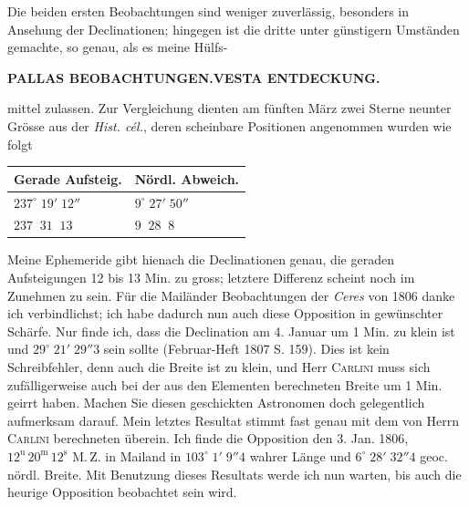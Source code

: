 \par\indent Die beiden ersten Beobachtungen sind weniger zuverlässig, besonders in Ansehung der Declinationen; hingegen ist die dritte unter günstigern Umständen gemachte, so genau, als es meine Hülfs-%
\begingroup
\renewcommand{\thefootnote}{}%
\makeatletter
\long\def\@makefntext#1{\noindent#1}%
\makeatother
{}
%
\endgroup
\par
{}
\clearpage
\thispagestyle{empty}
\noindent{}%
%
\parbox[t]{\dimexpr\linewidth-24mm\relax}{\centering\footnotesize\bfseries PALLAS BEOBACHTUNGEN.\enspace VESTA ENTDECKUNG.\par}%
\makebox[12mm][r]{}\par\nobreak\medskip
\noindent mittel zulassen. Zur Vergleichung dienten am fünften März zwei Sterne neunter Grösse aus der
\emph{Hist. cél.}, deren scheinbare Positionen angenommen wurden wie folgt

\begin{center}\begingroup
\fontsize{9}{11}\selectfont
\setlength{\tabcolsep}{3pt}\renewcommand{\arraystretch}{1.15}
\begin{tabular}{l|l}
Gerade Aufsteig. & Nördl. Abweich. \\
\hline
$237^\circ\;19'\;12''$ & $9^\circ\;27'\;50''$ \\
$237\;\;31\;\;13$ & $9\;\;28\;\;8$ \\
\end{tabular}\endgroup\end{center}

\par\indent Meine Ephemeride gibt hienach die Declinationen genau, die geraden Aufsteigungen 12 bis 13
Min. zu gross; letztere Differenz scheint noch im Zunehmen zu sein. Für die Mailänder Beobachtungen
der \emph{Ceres} von 1806 danke ich verbindlichst; ich habe dadurch nun auch diese Opposition in gewünschter Schärfe. Nur finde ich, dass die Declination am 4. Januar um 1 Min. zu klein ist und $29^\circ\;21'\;29''3$
sein sollte (Februar-Heft 1807 S. 159). Dies ist kein Schreibfehler, denn auch die Breite ist zu klein,
und Herr \textsc{Carlini} muss sich zufälligerweise auch bei der aus den Elementen berechneten Breite um
1 Min. geirrt haben. Machen Sie diesen geschickten Astronomen doch gelegentlich aufmerksam darauf.
Mein letztes Resultat stimmt fast genau mit dem von Herrn \textsc{Carlini} berechneten überein. Ich finde die
Opposition den 3. Jan. 1806, $12^{\mathrm u}\,20^{\mathrm m}\,12^{\mathrm s}$ M.\,Z. in Mailand in $103^\circ\;1'\;9''4$ wahrer Länge und
$6^\circ\;28'\;32''4$ geoc. nördl. Breite. Mit Benutzung dieses Resultats werde ich nun warten, bis auch die
heurige Opposition beobachtet sein wird.

